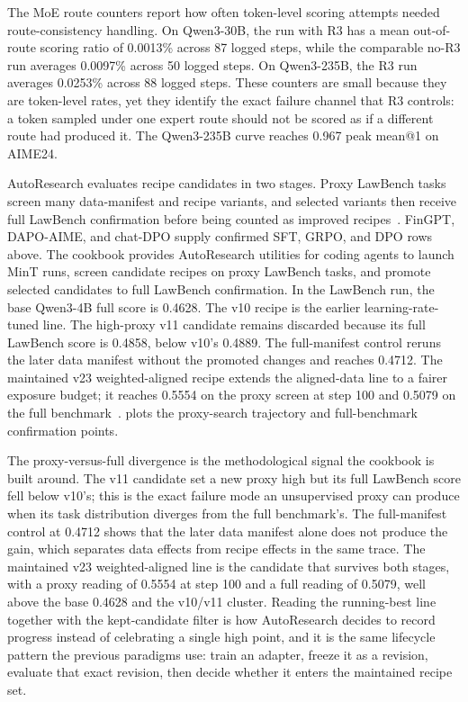 The MoE route counters report how often token-level scoring attempts needed route-consistency handling. On Qwen3-30B, the run with R3 has a mean out-of-route scoring ratio of 0.0013\% across 87 logged steps, while the comparable no-R3 run averages 0.0097\% across 50 logged steps. On Qwen3-235B, the R3 run averages 0.0253\% across 88 logged steps. These counters are small because they are token-level rates, yet they identify the exact failure channel that R3 controls: a token sampled under one expert route should not be scored as if a different route had produced it. The Qwen3-235B curve reaches 0.967 peak mean@1 on AIME24.

AutoResearch evaluates recipe candidates in two stages. Proxy LawBench tasks screen many data-manifest and recipe variants, and selected variants then receive full LawBench confirmation before being counted as improved recipes~\citep{lawbench2024}. FinGPT, DAPO-AIME, and chat-DPO supply confirmed SFT, GRPO, and DPO rows above. The cookbook provides AutoResearch utilities for coding agents to launch MinT runs, screen candidate recipes on proxy LawBench tasks, and promote selected candidates to full LawBench confirmation. In the LawBench run, the base Qwen3-4B full score is 0.4628. The v10 recipe is the earlier learning-rate-tuned line. The high-proxy v11 candidate remains discarded because its full LawBench score is 0.4858, below v10's 0.4889. The full-manifest control reruns the later data manifest without the promoted changes and reaches 0.4712. The maintained v23 weighted-aligned recipe extends the aligned-data line to a fairer exposure budget; it reaches 0.5554 on the proxy screen at step 100 and 0.5079 on the full benchmark~\citep{mint_cookbook2026}.  plots the proxy-search trajectory and full-benchmark confirmation points.

The proxy-versus-full divergence is the methodological signal the cookbook is built around. The v11 candidate set a new proxy high but its full LawBench score fell below v10's; this is the exact failure mode an unsupervised proxy can produce when its task distribution diverges from the full benchmark's. The full-manifest control at 0.4712 shows that the later data manifest alone does not produce the gain, which separates data effects from recipe effects in the same trace. The maintained v23 weighted-aligned line is the candidate that survives both stages, with a proxy reading of 0.5554 at step 100 and a full reading of 0.5079, well above the base 0.4628 and the v10/v11 cluster. Reading the running-best line together with the kept-candidate filter is how AutoResearch decides to record progress instead of celebrating a single high point, and it is the same lifecycle pattern the previous paradigms use: train an adapter, freeze it as a revision, evaluate that exact revision, then decide whether it enters the maintained recipe set.

